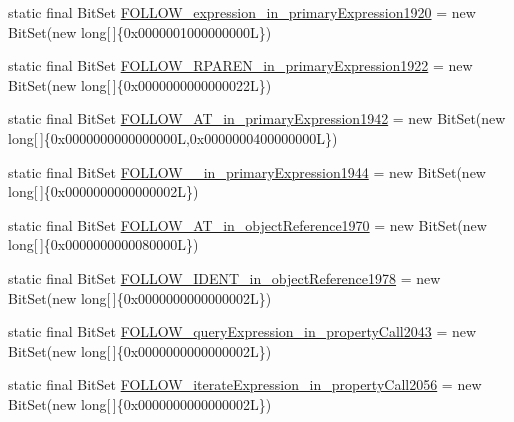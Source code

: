 \begin{DoxyCompactItemize}
\item 
static final Bit\-Set \hyperlink{classorg_1_1tzi_1_1use_1_1parser_1_1testsuite_1_1_test_suite_parser_a2cedf861e3c7ba2bddd0a3c908a0cb42}{F\-O\-L\-L\-O\-W\-\_\-expression\-\_\-in\-\_\-primary\-Expression1920} = new Bit\-Set(new long\mbox{[}$\,$\mbox{]}\{0x0000001000000000\-L\})
\item 
static final Bit\-Set \hyperlink{classorg_1_1tzi_1_1use_1_1parser_1_1testsuite_1_1_test_suite_parser_a9ce6a250ca809bc77a3ce9d8d06fcc80}{F\-O\-L\-L\-O\-W\-\_\-\-R\-P\-A\-R\-E\-N\-\_\-in\-\_\-primary\-Expression1922} = new Bit\-Set(new long\mbox{[}$\,$\mbox{]}\{0x0000000000000022\-L\})
\item 
static final Bit\-Set \hyperlink{classorg_1_1tzi_1_1use_1_1parser_1_1testsuite_1_1_test_suite_parser_a0dc92955559d549de2155409ed16cbd1}{F\-O\-L\-L\-O\-W\-\_\-\-A\-T\-\_\-in\-\_\-primary\-Expression1942} = new Bit\-Set(new long\mbox{[}$\,$\mbox{]}\{0x0000000000000000\-L,0x0000000400000000\-L\})
\item 
static final Bit\-Set \hyperlink{classorg_1_1tzi_1_1use_1_1parser_1_1testsuite_1_1_test_suite_parser_ac80c69608579c57e7c95f7ff3c0b92f1}{F\-O\-L\-L\-O\-W\-\_\-\_\-in\-\_\-primary\-Expression1944} = new Bit\-Set(new long\mbox{[}$\,$\mbox{]}\{0x0000000000000002\-L\})
\item 
static final Bit\-Set \hyperlink{classorg_1_1tzi_1_1use_1_1parser_1_1testsuite_1_1_test_suite_parser_ad10e3974ba83502029fbe2c92f993fca}{F\-O\-L\-L\-O\-W\-\_\-\-A\-T\-\_\-in\-\_\-object\-Reference1970} = new Bit\-Set(new long\mbox{[}$\,$\mbox{]}\{0x0000000000080000\-L\})
\item 
static final Bit\-Set \hyperlink{classorg_1_1tzi_1_1use_1_1parser_1_1testsuite_1_1_test_suite_parser_abb342cfc792cde396e810e06e9b26882}{F\-O\-L\-L\-O\-W\-\_\-\-I\-D\-E\-N\-T\-\_\-in\-\_\-object\-Reference1978} = new Bit\-Set(new long\mbox{[}$\,$\mbox{]}\{0x0000000000000002\-L\})
\item 
static final Bit\-Set \hyperlink{classorg_1_1tzi_1_1use_1_1parser_1_1testsuite_1_1_test_suite_parser_aefe5f28d26141bc627a3d32e3e371b34}{F\-O\-L\-L\-O\-W\-\_\-query\-Expression\-\_\-in\-\_\-property\-Call2043} = new Bit\-Set(new long\mbox{[}$\,$\mbox{]}\{0x0000000000000002\-L\})
\item 
static final Bit\-Set \hyperlink{classorg_1_1tzi_1_1use_1_1parser_1_1testsuite_1_1_test_suite_parser_a6eb57dd1292a1de1052bb1966d4190f5}{F\-O\-L\-L\-O\-W\-\_\-iterate\-Expression\-\_\-in\-\_\-property\-Call2056} = new Bit\-Set(new long\mbox{[}$\,$\mbox{]}\{0x0000000000000002\-L\})

\end{DoxyCompactItemize}
